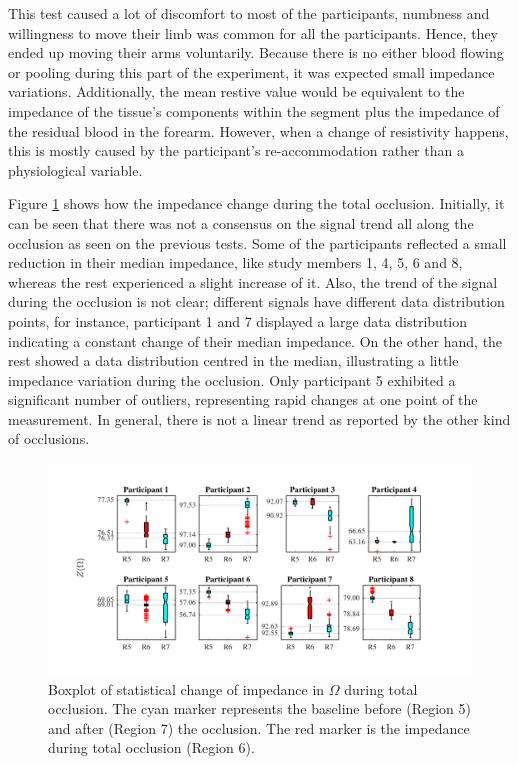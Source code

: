 This test caused a lot of discomfort to most of the participants, numbness and willingness to move their limb was common for all the participants. Hence, they ended up moving their arms voluntarily. Because there is no either blood flowing or pooling during this part of the experiment, it was expected small impedance variations. Additionally, the mean restive value would be equivalent to the impedance of the tissue's components within the segment plus the impedance of the residual blood in the forearm. However, when a change of resistivity happens, this is mostly caused by the participant's re-accommodation rather than a physiological variable. 

Figure \ref{fig:total arterial statistics impedance} shows how the impedance change during the total occlusion. Initially, it can be seen that there was not a consensus on the signal trend all along the occlusion as seen on the previous tests.  Some of the participants reflected a small reduction in their median impedance, like study members 1,  4, 5, 6 and 8, whereas the rest experienced a slight increase of it. Also, the trend of the signal during the occlusion is not clear; different signals have different data distribution points, for instance,  participant 1 and 7 displayed a large data distribution indicating a constant change of their median impedance. On the other hand, the rest showed a data distribution centred in the median, illustrating a little impedance variation during the occlusion. Only participant 5 exhibited a significant number of outliers, representing rapid changes at one point of the measurement. In general, there is not a linear trend as reported by the other kind of occlusions. 

\begin{figure}[!hpb]
	\centering
	\includegraphics[width=15cm,keepaspectratio]{figure_vop_7}    
	\caption[Change of impedance during total occlusion]{Boxplot of statistical change of impedance in $\Omega$ during total occlusion. The cyan marker represents the baseline before (Region 5) and after (Region 7) the occlusion. The red marker is the impedance during total occlusion (Region 6).}
	\label{fig:total arterial statistics impedance}
\end{figure} 


